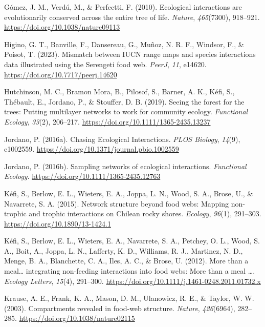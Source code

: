 \documentclass[
]{article}
\newlength{\cslhangindent}
\newenvironment{CSLReferences}[2] %
 {\begin{list}{}{%
  \setlength{\itemindent}{0pt}
  \setlength{\leftmargin}{0pt}
  \setlength{\parsep}{0pt}
  \ifodd #1
   \setlength{\leftmargin}{\cslhangindent}
   \setlength{\itemindent}{-1\cslhangindent}
  \fi
  \setlength{\itemsep}{#2\baselineskip}}}
 {\end{list}}
\begin{document}
\begin{CSLReferences}{1}{0}
Gómez, J. M., Verdú, M., \& Perfectti, F. (2010). Ecological
interactions are evolutionarily conserved across the entire tree of
life. \emph{Nature}, \emph{465}(7300), 918--921.
\url{https://doi.org/10.1038/nature09113}

Higino, G. T., Banville, F., Dansereau, G., Muñoz, N. R. F., Windsor,
F., \& Poisot, T. (2023). Mismatch between {IUCN} range maps and species
interactions data illustrated using the {Serengeti} food web.
\emph{PeerJ}, \emph{11}, e14620.
\url{https://doi.org/10.7717/peerj.14620}

Hutchinson, M. C., Bramon Mora, B., Pilosof, S., Barner, A. K., Kéfi,
S., Thébault, E., Jordano, P., \& Stouffer, D. B. (2019). Seeing the
forest for the trees: {Putting} multilayer networks to work for
community ecology. \emph{Functional Ecology}, \emph{33}(2), 206--217.
\url{https://doi.org/10.1111/1365-2435.13237}

Jordano, P. (2016a). Chasing {Ecological Interactions}. \emph{PLOS
Biology}, \emph{14}(9), e1002559.
\url{https://doi.org/10.1371/journal.pbio.1002559}

Jordano, P. (2016b). Sampling networks of ecological interactions.
\emph{Functional Ecology}. \url{https://doi.org/10.1111/1365-2435.12763}

Kéfi, S., Berlow, E. L., Wieters, E. A., Joppa, L. N., Wood, S. A.,
Brose, U., \& Navarrete, S. A. (2015). Network structure beyond food
webs: Mapping non-trophic and trophic interactions on {Chilean} rocky
shores. \emph{Ecology}, \emph{96}(1), 291--303.
\url{https://doi.org/10.1890/13-1424.1}

Kéfi, S., Berlow, E. L., Wieters, E. A., Navarrete, S. A., Petchey, O.
L., Wood, S. A., Boit, A., Joppa, L. N., Lafferty, K. D., Williams, R.
J., Martinez, N. D., Menge, B. A., Blanchette, C. A., Iles, A. C., \&
Brose, U. (2012). More than a meal{\ldots{}} integrating non-feeding
interactions into food webs: {More} than a meal {\ldots{}}.
\emph{Ecology Letters}, \emph{15}(4), 291--300.
\url{https://doi.org/10.1111/j.1461-0248.2011.01732.x}

Krause, A. E., Frank, K. A., Mason, D. M., Ulanowicz, R. E., \& Taylor,
W. W. (2003). Compartments revealed in food-web structure.
\emph{Nature}, \emph{426}(6964), 282--285.
\url{https://doi.org/10.1038/nature02115}


\end{CSLReferences}
\end{document}
